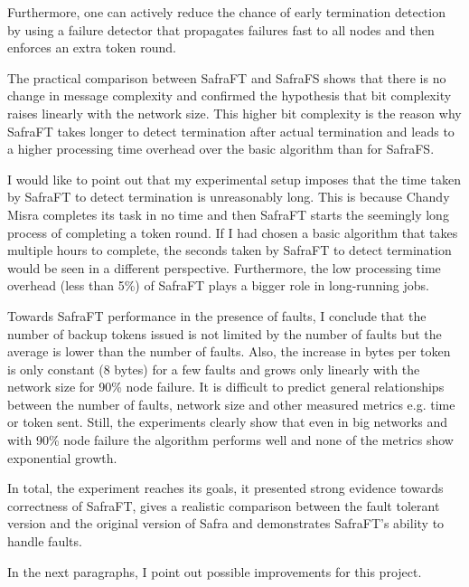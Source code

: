 Furthermore, one can actively reduce the chance of early termination detection by using a failure detector that propagates failures fast to all nodes and then enforces an extra token round.    

The practical comparison between SafraFT and SafraFS shows that there is no change in message complexity and confirmed the hypothesis that bit complexity raises linearly with the network size. 
This higher bit complexity is the reason why SafraFT takes longer to detect termination after actual termination and leads to a higher processing time overhead over the basic algorithm than for SafraFS.

I would like to point out that my experimental setup imposes that the time taken by SafraFT to detect termination is unreasonably long.
This is because Chandy Misra completes its task in no time and then SafraFT starts the seemingly long process of completing a token round.
If I had chosen a basic algorithm that takes multiple hours to complete, the seconds taken by SafraFT to detect termination would be seen in a different perspective.
Furthermore, the low processing time overhead (less than 5\%) of SafraFT plays a bigger role in long-running jobs.

Towards SafraFT performance in the presence of faults, I conclude that the number of backup tokens issued is not limited by the number of faults but the average is lower than the number of faults.
Also, the increase in bytes per token is only constant (8 bytes) for a few faults and grows only linearly with the network size for 90\% node failure.
It is difficult to predict general relationships between the number of faults, network size and other measured metrics e.g. time or token sent.  
Still, the experiments clearly show that even in big networks and with 90\% node failure the algorithm performs well and none of the metrics show exponential growth.

In total, the experiment reaches its goals, it presented strong evidence towards correctness of SafraFT, gives a realistic comparison between the fault tolerant version and the original version of Safra and demonstrates SafraFT's ability to handle faults.

In the next paragraphs, I point out possible improvements for this project.

